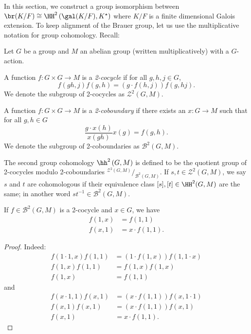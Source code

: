 In this section, we construct a group isomorphism between $\br(K/F) \cong \HH^{2}\left(\gal(K/F), K^{\star}\right)$ where $K/F$ is a finite dimensional Galois extension. To keep alignment of the Brauer group, let us use the multiplicative notation for group cohomology. Recall:

\begin{definition}
  \label{def:second-group-coh}
  Let $G$ be a group and $M$ an abelian group (written multiplicatively) with a $G$-action.

  A function $f : G \times G \to M$ is a {\em 2-cocycle\/} if for all $g,h,j\in G$,
  \[
    f(gh, j)f(g, h) = \left(g\cdot f(h, j)\right) f(g, hj).
  \]
  We denote the subgroup of 2-cocycles as $\mathcal{Z}^{2}(G, M)$.

  A function $f : G\times G \to M$ is a {\em 2-coboundary\/} if there exists an $x : G \to M$ such that for all $g, h \in G$
  \[
    \frac{g\cdot x(h)}{x(gh)} x(g) = f(g, h).
  \]
  We denote the subgroup of 2-coboundaries as $\mathcal{B}^{2}(G, M)$.

  The second group cohomology $\hh^{2}\left(G, M\right)$ is defined to be the quotient group of 2-cocycles modulo 2-coboundaries $^{\mathcal{Z}^{2}(G, M)}/_{\mathcal{B}^{2}(G, M)}$. If $s, t \in \mathcal{Z}^{2}(G, M)$, we say $s$ and $t$ are cohomologous if their equivalence class $[s], [t] \in \HH^{2}(G, M)$ are the same; in another word $st^{-1}\in\mathcal{B}^{2}(G, M)$.
  \leanok
\end{definition}

\begin{lemma}\label{lem:2-cocycle-one-one}
  If $f \in \mathcal{B}^{2}(G, M)$ is a 2-cocycle and $x\in G$, we have
  \[
    \begin{aligned}
    f(1, x) &= f(1, 1) \\
    f(x, 1) &= x\cdot f(1, 1).
    \end{aligned}
  \]
\end{lemma}
\begin{proof}
  Indeed:
  \[
    \begin{aligned}
      f(1\cdot 1, x)f(1, 1) &= (1\cdot f(1,x))f(1, 1\cdot x)  \\
      f(1, x)f(1, 1) &= f(1, x) f(1,x) \\
      f(1, x) &= f(1,1)
    \end{aligned}
  \] and
  \[
    \begin{aligned}
      f(x\cdot 1, 1)f(x, 1) &= (x\cdot f(1, 1))f(x, 1\cdot 1)\\
      f(x, 1)f(x, 1) &= (x\cdot f(1, 1))f(x, 1)\\
      f(x, 1) &= x \cdot f(1, 1).
    \end{aligned}
  \]
  \leanok
\end{proof}

